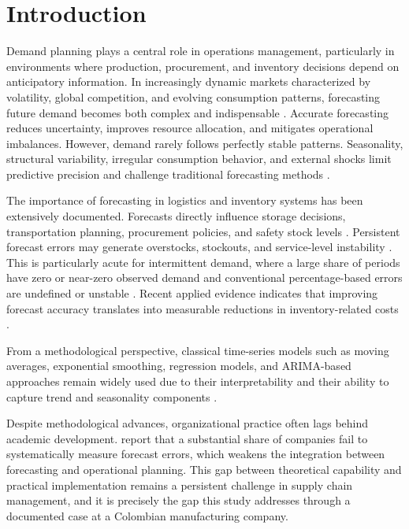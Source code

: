 \documentclass[forecasting,article,submit,pdftex,moreauthors]{Definitions/mdpi}
\begin{document}
\section{Introduction}

Demand planning plays a central role in operations management, particularly in environments where production, procurement, and inventory decisions depend on anticipatory information. In increasingly dynamic markets characterized by volatility, global competition, and evolving consumption patterns, forecasting future demand becomes both complex and indispensable \cite{mentzer2001,chopra2021}. Accurate forecasting reduces uncertainty, improves resource allocation, and mitigates operational imbalances. However, demand rarely follows perfectly stable patterns. Seasonality, structural variability, irregular consumption behavior, and external shocks limit predictive precision and challenge traditional forecasting methods \cite{makridakis1998,hyndman2021}.

The importance of forecasting in logistics and inventory systems has been extensively documented. Forecasts directly influence storage decisions, transportation planning, procurement policies, and safety stock levels \cite{ballou2004}. Persistent forecast errors may generate overstocks, stockouts, and service-level instability \cite{silver1998}. This is particularly acute for intermittent demand, where a large share of periods have zero or near-zero observed demand and conventional percentage-based errors are undefined or unstable \cite{syntetos2005}. Recent applied evidence indicates that improving forecast accuracy translates into measurable reductions in inventory-related costs \cite{sattar2025}.

From a methodological perspective, classical time-series models such as moving averages, exponential smoothing, regression models, and ARIMA-based approaches remain widely used due to their interpretability and their ability to capture trend and seasonality components \cite{makridakis1998,nahmias2015,hyndman2021}.

Despite methodological advances, organizational practice often lags behind academic development. \citeauthor{kerkkanen2009} \cite{kerkkanen2009} report that a substantial share of companies fail to systematically measure forecast errors, which weakens the integration between forecasting and operational planning. This gap between theoretical capability and practical implementation remains a persistent challenge in supply chain management, and it is precisely the gap this study addresses through a documented case at a Colombian manufacturing company.
\end{document}
